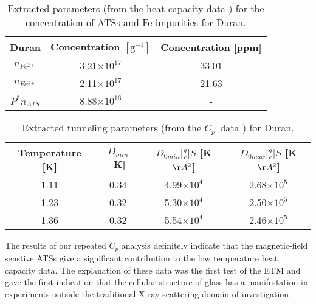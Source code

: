 \documentclass[10pt]{article}
\begin{document}
\begin{table}[htbp]
\begin{center}
\begin{tabular}{|c|c|c|}
\hline
Duran & Concentration $\mathrm{[g^{-1}]}$ & Concentration [ppm] \\
\hline
\hline
\textbf{$n_{Fe^{2+}}$} & 3.21$\times10^{17}$ &  33.01 \\
\textbf{$n_{Fe^{3+}}$} & 2.11$\times10^{17}$ &  21.63 \\
\textbf{$P^{\ast}n_{ATS}$} & 8.88$\times10^{16}$ & - \\
\hline
\end{tabular}
\caption{Extracted parameters (from the heat capacity data \cite{Sie2001}) for the
concentration of ATSs and Fe-impurities for Duran.}
\label{tab_imp_extr_dur}
\end{center}
\end{table}
\begin{table}[htbp]
\begin{center}
\begin{tabular}{|c|c|c|c|}
\hline
Temperature [K] & $D_{min}$ [K] & $D_{0min}\vert\frac{q}{e}\vert S$ [K$\AA^2$] & $D_{0max}\vert\frac{q}{e}\vert S$ [K$\AA^2$]\\
\hline
\hline
1.11 & 0.34 & 4.99$\times 10^{4}$ & 2.68$\times 10^{5}$ \\
1.23 & 0.32 & 5.30$\times 10^{4}$ & 2.50$\times 10^{5}$ \\
1.36 & 0.32 & 5.54$\times 10^{4}$ & 2.46$\times 10^{5}$ \\
\hline
\end{tabular}
\caption{Extracted tunneling parameters (from the $C_p$~data \cite{Sie2001}) 
for Duran.}
\label{tab_d0_duran_extr}
\end{center}
\end{table}
The results of our repeated \cite{Jug2004} $C_p$ analysis definitely indicate that 
the magnetic-field senstive ATSs give a significant contribution to the low 
temperature heat capacity data. The explanation of these data \cite{Jug2004} was the 
first test of the ETM and gave the first indication that the cellular structure of glass has 
a manifestation in experiments outside the traditional  X-ray scattering domain of 
investigation. 
\end{document}
